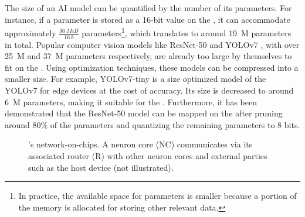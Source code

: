 The size of an AI model can be quantified by the number of its parameters.
For instance, if a parameter is stored as a 16-bit value on the \graicore{}, it can accommodate approximately $\frac{\SI{36}{MiB}}{\SI{16}{b}}$ parameters\footnote{In practice, the available space for parameters is smaller because a portion of the memory is allocated for storing other relevant data.}, which translates to around \SI{19}{M} parameters in total.
Popular computer vision models like ResNet-50 \cite{heDeepResidualLearning2015} and YOLOv7 \cite{wangYOLOv7TrainableBagoffreebies2022}, with over \SI{25}{M} and \SI{37}{M} parameters respectively, are already too large by themselves to fit on the \graicore{}.
Using optimization techniques, these models can be compressed into a smaller size.
For example, YOLOv7-tiny \cite{wangYOLOv7TrainableBagoffreebies2022} is a size optimized model of the YOLOv7 for edge devices at the cost of accuracy.
Its size is decreased to around \SI{6}{M} parameters, making it suitable for the \graicore{}.
Furthermore, it has been demonstrated that the ResNet-50 model can be mapped on the \graicore{} after pruning around 80\% of the parameters and quantizing the remaining parameters to 8 bits.

\begin{figure}[htbp]
    \centering
    \hfill
    \caption{\graicore{}'s network-on-chips. A neuron core (NC) communicates via its associated router (R) with other neuron cores and external parties such as the host device (not illustrated).}
    \label{fig:noc}
\end{figure}

